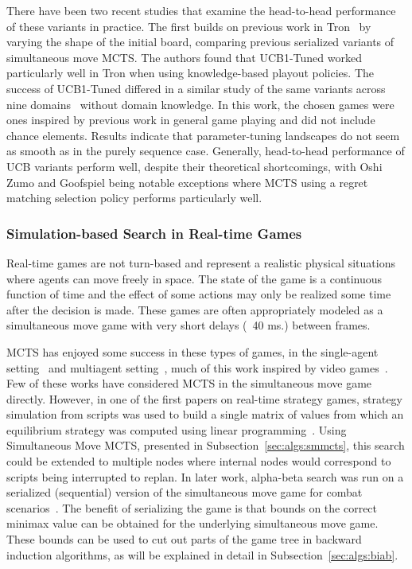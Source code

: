 
There have been two recent studies that examine the head-to-head performance of these variants in practice. 
The first builds on previous work in Tron~\cite{Lanctot13Tron} by varying the shape of the initial board, 
comparing previous serialized variants of simultaneous move MCTS. The authors found that UCB1-Tuned worked 
particularly well in Tron when using knowledge-based playout policies. The success of UCB1-Tuned differed in 
a similar study of the same variants across nine domains~\cite{Tak14smmcts} without domain knowledge. In this 
work, the chosen games were ones inspired by previous work in general game playing and did not include chance elements. 
Results indicate that parameter-tuning landscapes do not seem as smooth as in the purely sequence case. 
Generally, head-to-head performance of UCB variants perform well, despite their theoretical shortcomings, with Oshi Zumo and 
Goofspiel being notable exceptions where MCTS using a regret matching selection policy performs particularly well.

\subsubsection{Simulation-based Search in Real-time Games}


Real-time games are not turn-based and represent a realistic physical situations where agents can move freely in space. 
The state of the game is a continuous function of time and the effect of some actions may only be realized some time 
after the decision is made. These games are often appropriately modeled as a simultaneous move game with very short 
delays (~40 ms.) between frames. 

MCTS has enjoyed some success in these types of games, in the single-agent 
setting~\cite{Pepels14Monte,Perez14PTSP} and multiagent setting~\cite{Balla09UCT}, much of this work inspired by video 
games~\cite{Cowling13Video,BellemareNVB13,Ontanon13RTSSurvey}. Few of these works have considered MCTS
in the simultaneous move game directly. 
However, in one of the first papers on real-time strategy games, strategy simulation
from scripts was used to build a single matrix of values from which an equilibrium strategy was 
computed using linear programming~\cite{Sailor07adversarial}.  
Using Simultaneous Move MCTS, presented in Subsection~\ref{sec:algs:smmcts}, this search could be extended 
to multiple nodes where internal nodes would correspond to scripts being interrupted to replan. 
In later work, alpha-beta search was run on a serialized (sequential) version of the 
simultaneous move game for combat scenarios~\cite{Churchill2012Fast}. The benefit of serializing the game is that bounds 
on the correct minimax value can be obtained for the underlying simultaneous move game. These bounds can be used to cut out
parts of the game tree in backward induction algorithms, as will be explained in detail in Subsection~\ref{sec:algs:biab}.





